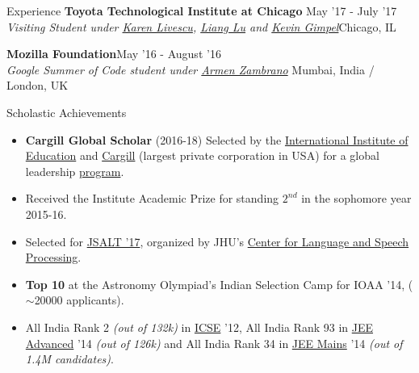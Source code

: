 \documentclass{resume} %
\begin{document}
\vspace*{-1.5mm}
\begin{rSection}{Experience}
{\bf Toyota Technological Institute at Chicago}{ \hfill May '17 - July '17}\\ \textit{Visiting Student under \href{http://ttic.uchicago.edu/~klivescu/}{Karen Livescu}, \href{http://ttic.uchicago.edu/~llu/}{Liang Lu} and \href{http://ttic.uchicago.edu/~kgimpel/}{Kevin Gimpel}}{\hfill Chicago, IL}

{\bf Mozilla Foundation}{\hfill May '16 - August '16} \\ \textit{Google Summer of Code student under \href{https://github.com/armenzg}{Armen Zambrano}}{ \hfill Mumbai, India / London, UK}
\end{rSection}
\vspace*{-1.5mm}
\begin{rSection}{Scholastic Achievements}
\begin{itemize}[leftmargin=*]
\itemsep -0.5em 
\item \textbf{Cargill Global Scholar} (2016-18) Selected by the \href{https://en.wikipedia.org/wiki/Institute_of_International_Education}{International Institute of Education} and \href{https://en.wikipedia.org/wiki/Cargill}{Cargill} (largest private corporation in USA) for a global leadership \href{https://www.cargillglobalscholars.com/}{program}.
\item Received the Institute Academic Prize for standing $2^{nd}$ in the  sophomore year 2015-16.
\item Selected for \href{https://www.lti.cs.cmu.edu/2017-jsalt-undergraduate}{JSALT '17}, organized by JHU's \href{https://www.clsp.jhu.edu/}{Center for Language and Speech Processing}\footnotemark[2]. 
\item \textbf{Top 10} at the Astronomy Olympiad's Indian Selection Camp for IOAA '14, ($\sim$20000 applicants).
\item All India Rank 2 \textit{(out of 132k)} in \href{https://en.wikipedia.org/wiki/Indian_Certificate_of_Secondary_Education}{ICSE} '12, All India Rank 93 in \href{https://en.wikipedia.org/wiki/Joint_Entrance_Examination}{JEE Advanced} '14 \textit{(out of 126k)} and All India Rank 34 in \href{https://en.wikipedia.org/wiki/Joint_Entrance_Examination}{JEE Mains} '14 \textit{(out of 1.4M candidates)}.
\end{itemize}
\end{rSection}
\vspace*{-1.5mm}
\end{document}
